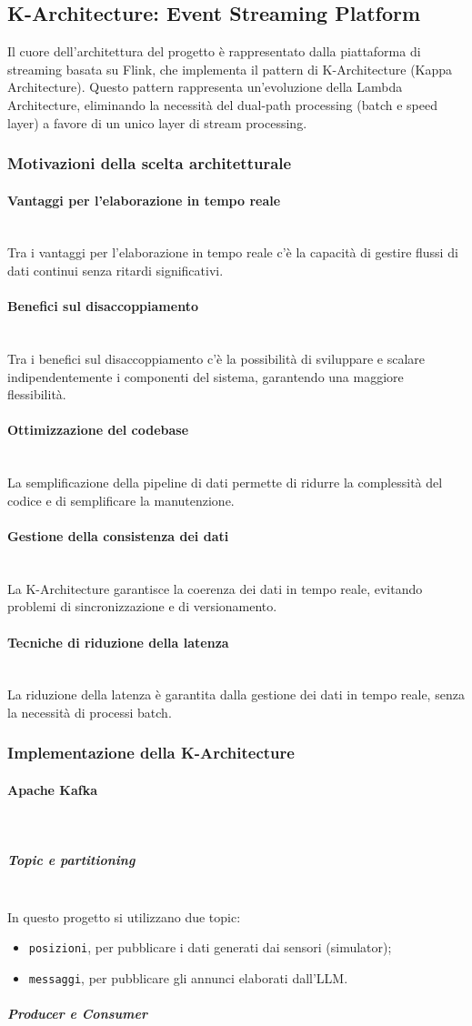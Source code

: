 \documentclass[10pt]{article}
\newcommand{\myparagraph}[1]{\paragraph{#1}\mbox{}\\}
\newcommand{\mysubparagraph}[1]{\subparagraph{#1}\mbox{}\\}
\begin{document}
\subsection{K-Architecture: Event Streaming Platform}
Il cuore dell'architettura del progetto è rappresentato dalla piattaforma di streaming basata su Flink, che implementa il pattern di K-Architecture (Kappa Architecture). Questo pattern rappresenta un'evoluzione della Lambda Architecture, eliminando la necessità del dual-path processing (batch e speed layer) a favore di un unico layer di stream processing.
    \subsubsection{Motivazioni della scelta architetturale}
        \myparagraph{Vantaggi per l'elaborazione in tempo reale}
        Tra i vantaggi per l'elaborazione in tempo reale c'è la capacità di gestire flussi di dati continui senza ritardi significativi.
        \myparagraph{Benefici sul disaccoppiamento}
        Tra i benefici sul disaccoppiamento c'è la possibilità di sviluppare e scalare indipendentemente i componenti del sistema, garantendo una maggiore flessibilità.
        \myparagraph{Ottimizzazione del codebase}
        La semplificazione della pipeline di dati permette di ridurre la complessità del codice e di semplificare la manutenzione.
        \myparagraph{Gestione della consistenza dei dati}
        La K-Architecture garantisce la coerenza dei dati in tempo reale, evitando problemi di sincronizzazione e di versionamento.
        \myparagraph{Tecniche di riduzione della latenza}
        La riduzione della latenza è garantita dalla gestione dei dati in tempo reale, senza la necessità di processi batch.
    
    \subsubsection{Implementazione della K-Architecture}
        \myparagraph{Apache Kafka}
            \mysubparagraph{Topic e partitioning}
        In questo progetto si utilizzano due topic: 
        \begin{itemize}
        \item \texttt{posizioni}, per pubblicare i dati generati dai sensori (simulator);
        \item \texttt{messaggi}, per pubblicare gli annunci elaborati dall’LLM.
        \end{itemize}

        \mysubparagraph{Producer e Consumer}
\end{document}
